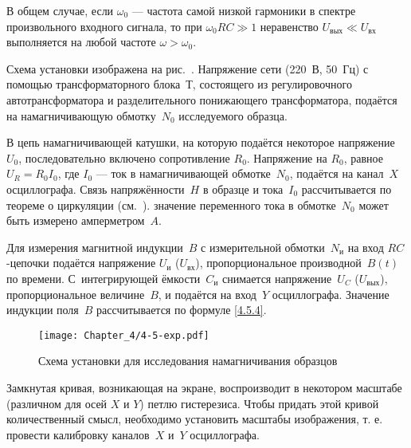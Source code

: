В общем случае, если $\omega_0$ --- частота самой низкой гармоники в спектре произвольного
входного сигнала, то при $\omega_0 R C\gg1$ неравенство $U_{вых}\ll U_{вх}$ выполняется
на любой частоте $\omega>\omega_0$.







\experiment
 Схема установки изображена на рис.~.
Напряжение сети (220~В, 50~Гц) с помощью трансформаторного блока~Т,
состоящего из регулировочного автотрансформатора
и разделительного понижающего трансформатора, подаётся на намагничивающую
обмотку~$N_0$ исследуемого образца.

В цепь намагничивающей катушки, на которую подаётся некоторое напряжение
$U_0$, последовательно включено сопротивление $R_0$.
Напряжение на $R_0$, равное $U_R=R_0I_0$, где $I_0$ --- ток в
намагничивающей обмотке~$N_0$, подаётся на канал~$X$ осциллографа.
Связь напряжённости~$H$ в образце и тока~$I_0$ рассчитывается по теореме
о циркуляции (см.~).
 значение переменного тока в обмотке~$N_0$ может быть измерено
амперметром~$A$.

Для измерения магнитной индукции~$B$ с измерительной обмотки~$N_{и}$ на
вход $RC$-цепочки подаётся напряжение $U_{и}$ ($U_{вх}$),
пропорциональное производной~$B(t)$ по времени.
С~интегрирующей ёмкости~$C_{и}$ снимается напряжение~$U_C$ ($U_{вых}$),
пропорциональное величине~$B$, и подаётся на вход~$Y$ осциллографа.
Значение индукции поля~$B$ рассчитывается по формуле
\eqref{4.5.4}.

\begin{figure}[h!]
    \centering
    \texttt{[image: Chapter\_4/4-5-exp.pdf]}
	\caption{Схема установки для исследования намагничивания образцов}
\end{figure}

Замкнутая кривая, возникающая на экране, воспроизводит в некотором масштабе
(различном для осей $X$ и $Y$) петлю гистерезиса. Чтобы придать этой кривой
количественный смысл, необходимо установить масштабы изображения, т. е. провести
калибровку каналов~$X$ и~$Y$ осциллографа.
%



